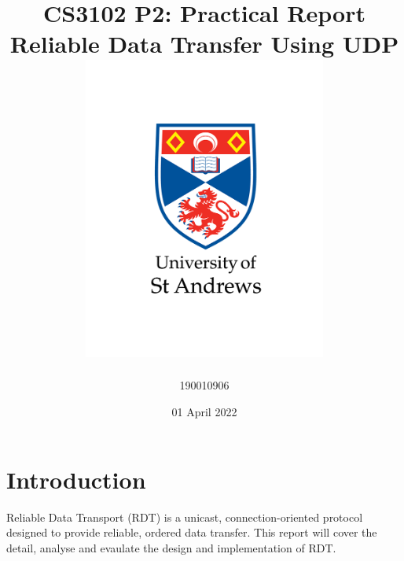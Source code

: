 \documentclass[12pt]{article}
\title{
{CS3102 P2: Practical Report}\\
{\large Reliable Data Transfer Using UDP}\\
{\includegraphics[width=80mm]{images/university-logo.png}}
}
\author{190010906}
\date{01 April 2022}
\begin{document}
\maketitle

\newpage

\section{Introduction}

Reliable Data Transport (RDT) is a unicast, connection-oriented protocol designed to provide reliable, ordered data transfer. This report will cover the detail, analyse and evaulate the design and implementation of RDT.











\newpage




\newpage

\end{document}
